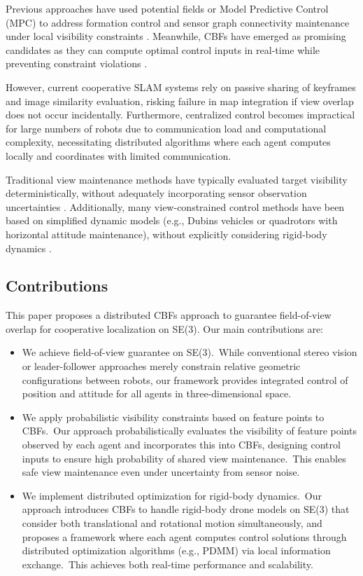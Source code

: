 \documentclass[fleqn,10pt,twocolumn]{SICE_FES25}
\theoremstyle{definition}
\theoremstyle{plain}
\begin{document}
Previous approaches have used potential fields or Model Predictive Control (MPC) to address formation control and sensor graph connectivity maintenance under local visibility constraints \cite{ref5}. Meanwhile, CBFs have emerged as promising candidates as they can compute optimal control inputs in real-time while preventing constraint violations \cite{ref6} \cite{ref7}.

However, current cooperative SLAM systems rely on passive sharing of keyframes and image similarity evaluation, risking failure in map integration if view overlap does not occur incidentally. Furthermore, centralized control becomes impractical for large numbers of robots due to communication load and computational complexity, necessitating distributed algorithms where each agent computes locally and coordinates with limited communication.

Traditional view maintenance methods have typically evaluated target visibility deterministically, without adequately incorporating sensor observation uncertainties \cite{ref8}. Additionally, many view-constrained control methods have been based on simplified dynamic models (e.g., Dubins vehicles or quadrotors with horizontal attitude maintenance), without explicitly considering rigid-body dynamics \cite{ref9}.

\subsection{Contributions}

This paper proposes a distributed CBFs approach to guarantee field-of-view overlap for cooperative localization on SE(3). Our main contributions are:

\begin{itemize}
\item We achieve field-of-view guarantee on SE(3).~While conventional stereo vision or leader-follower approaches merely constrain relative geometric configurations between robots, our framework provides integrated control of position and attitude for all agents in three-dimensional space.
\item We apply probabilistic visibility constraints based on feature points to CBFs.~Our approach probabilistically evaluates the visibility of feature points observed by each agent and incorporates this into CBFs, designing control inputs to ensure high probability of shared view maintenance.~This enables safe view maintenance even under uncertainty from sensor noise.
\item We implement distributed optimization for rigid-body dynamics.~Our approach introduces CBFs to handle rigid-body drone models on SE(3) that consider both translational and rotational motion simultaneously, and proposes a framework where each agent computes control solutions through distributed optimization algorithms (e.g., PDMM) via local information exchange.~This achieves both real-time performance and scalability.
\end{itemize}
\end{document}
